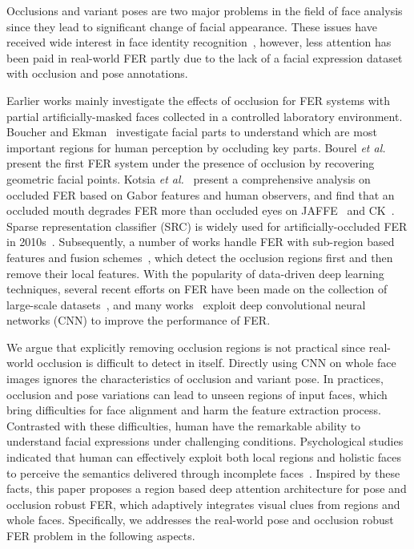 \documentclass[journal]{IEEEtran}
\newcommand{\pxj}[1]{\textcolor[rgb]{0,0,0}{#1}}
\newcommand{\rpxj}[1]{\textcolor[rgb]{0,0,0}{#1}}
\newcommand{\peng}[1]{\textcolor[rgb]{0,0,0}{#1}}
\begin{document}
Occlusions and variant poses are two major problems in the field of face analysis since \pxj{they} lead to significant change of facial appearance. These issues have received wide interest in face identity recognition~\cite{ding2016comprehensive,liao2013partial}, however, less attention has been paid in real-world FER partly due to the lack of a facial expression dataset with occlusion and pose annotations.

Earlier works mainly investigate the effects of occlusion for FER systems with partial artificially-masked faces collected in a controlled laboratory environment. \pxj{Boucher and Ekman~\cite{boucher1975facial} investigate facial parts to understand which are most important regions for human perception by occluding key parts.} Bourel \textit{et al.}~\cite{bourel2001recognition} present the first FER system under the presence of occlusion by recovering geometric facial points. 
Kotsia \textit{et al.}~\cite{kotsia2008analysis} present a comprehensive analysis on occluded FER based on Gabor features and human observers, and find that an occluded mouth degrades FER more than occluded eyes on JAFFE~\cite{lyons1998japanese} and CK~\cite{kanade2000comprehensive}. Sparse representation classifier (SRC) is widely used for artificially-occluded FER in 2010s~\cite{cotter2010sparse,zhang2012robust,cotter2010weighted}. Subsequently, a number of works handle FER with sub-region based features and fusion schemes~\cite{happy2015automatic,zhang2014facial,zhang2014random}, which detect the occlusion regions first and then remove their local features. With the popularity of data-driven deep learning techniques, several recent efforts on FER have been made on the collection of large-scale datasets~\cite{fabian2016emotionet,mollahosseini2017affectnet,li2017reliable}, and many works~\cite{Tang2013Deep,Kahou2013Combining,Liu2015AU,batista2017aumpnet,Albanie18,shanli18} \pxj{exploit deep convolutional neural networks (CNN) to improve the performance of FER.}

\pxj{We argue that explicitly removing occlusion regions is not practical since real-world occlusion is difficult to detect in itself. Directly using CNN on whole face images ignores the characteristics of occlusion and variant pose. In practices, occlusion and pose variations can lead to unseen regions of input faces, which bring difficulties for face alignment and harm the feature extraction process. Contrasted with these difficulties, human have the remarkable ability to understand facial expressions under challenging conditions. Psychological studies indicated that human can effectively exploit both local regions and holistic faces to perceive the semantics delivered through incomplete faces~\cite{yovel}. Inspired by these facts, this paper proposes a \peng{region} based deep attention architecture for pose and occlusion robust FER, which adaptively integrates visual clues from regions and whole faces. \rpxj{Specifically, we addresses the real-world pose and occlusion robust FER problem in the following aspects.}}
\end{document}
